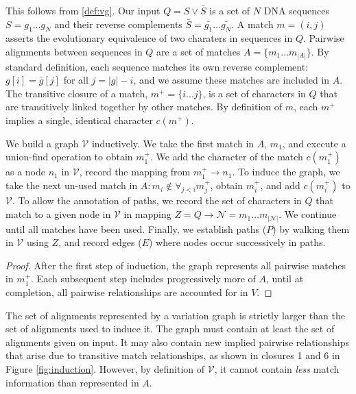 \documentclass{bioinfo}
\theoremstyle{definition}
\begin{document}
This follows from \ref{def:vg}.
Our input $Q = S \vee \bar{S}$ is a set of $N$ DNA sequences $S = g_1 \ldots g_N$ and their reverse complements $\bar{S} = \bar{g_1} \ldots \bar{g_N}$.
A match $m = (i, j)$ asserts the evolutionary equivalence of two charaters in sequences in $Q$.
Pairwise alignments between sequences in $Q$ are a set of matches $A = \{ m_1 \ldots m_{|A|} \}$.
By standard definition, each sequence matches its own reverse complement: $g[i] = \bar{g}[j]$ for all $j = |g| - i$, and we assume these matches are included in $A$.
The transitive closure of a match, $m^+ = \{ i \ldots j \}$, is a set of characters in $Q$ that are transitively linked together by other matches.
By definition of $m$, each $m^+$ implies a single, identical character $c(m^+)$.

We build a graph $\mathcal{V}$ inductively.
We take the first match in $A$, $m_1$, and execute a union-find operation to obtain $m_1^+$.
We add the character of the match $c(m_1^+)$ as a node $n_1$ in $\mathcal{V}$, record the mapping from $m_1^+ \to n_1$.
To induce the graph, we take the next un-used match in $A : m_i \notin \forall_{j < i} m_j^+$, obtain $m_i^+$, and add $c(m_i^+)$ to $\mathcal{V}$.
To allow the annotation of paths, we record the set of characters in $Q$ that match to a given node in $\mathcal{V}$ in mapping $Z = Q \to \mathcal{N} = m_1 \ldots m_{|\mathcal{N}|}$.
We continue until all matches have been used.
Finally, we establish paths ($P$) by walking them in $\mathcal{V}$ using $Z$, and record edges ($E$) where nodes occur successively in paths.

\begin{proof}
After the first step of induction, the graph represents all pairwise matches in $m_1^+$.
Each subsequent step includes progressively more of $A$, until at completion, all pairwise relationships are accounted for in $V$.
\end{proof}

The set of alignments represented by a variation graph is strictly larger than the set of alignments used to induce it.
The graph must contain at least the set of alignments given on input.
It may also contain new implied pairwise relationships that arise due to transitive match relationships, as shown in closures 1 and 6 in Figure \ref{fig:induction}.
However, by definition of $\mathcal{V}$, it cannot contain \textit{less} match information than represented in $A$.
\end{document}
